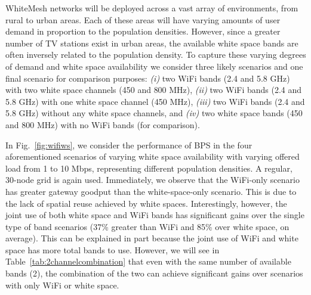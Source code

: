  

WhiteMesh networks will be deployed across a vast array of environments, from
rural to urban areas.  Each of these areas will have varying amounts of user 
demand in proportion to the population densities.  However, since a greater
number of TV stations exist in urban areas, the available white space bands are
often inversely related to the population density. To capture these varying
degrees of demand and white space availability we consider three likely scenarios
and one final scenario for comparison purposes: {\it (i)} two WiFi bands (2.4 and
5.8 GHz) with two white space channels (450 and 800 MHz), {\it (ii)} two WiFi
bands (2.4 and 5.8 GHz) with one white space channel (450 MHz), {\it (iii)} two
WiFi bands (2.4 and 5.8 GHz) without any white space channels, and {\it (iv)}
two white space bands (450 and 800 MHz) with no WiFi bands (for comparison).

In Fig.~\ref{fig:wifiws}, we consider the performance of BPS in the four aforementioned
scenarios of varying white space availability with varying offered load from 1 to 10 Mbps,
representing different population densities. A regular, 30-node grid is again used.
Immediately, we observe that the WiFi-only scenario has greater gateway goodput
than the white-space-only scenario.  This is due to the lack of spatial reuse achieved
by white spaces.  Interestingly, however, the joint use of both white space and WiFi
bands has significant gains over the single type of band scenarios (37\% greater than
WiFi and 85\% over white space, on average).  This can be explained in part
because the joint use of WiFi and white space has more total bands to use.  However,
we will see in Table~\ref{tab:2channelcombination} that even with the same number of
available bands (2), the combination of the two can achieve significant gains over
scenarios with only WiFi or white space.   

